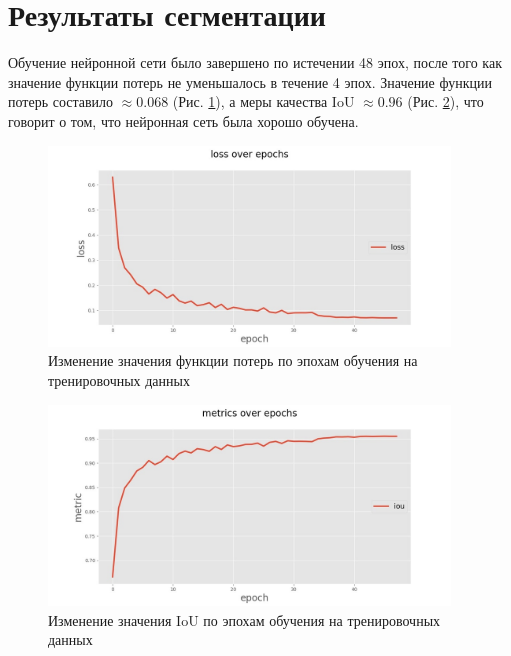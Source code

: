 \section{Результаты сегментации}
Обучение нейронной сети было завершено по истечении 48 эпох, после того как значение функции потерь не уменьшалось в течение 4 эпох. Значение функции потерь составило $\approx 0.068$ (Рис. \ref{fig:train_loss}), а меры качества IoU $\approx 0.96$ (Рис. \ref{fig:train_iou}), что говорит о том, что нейронная сеть была хорошо обучена.
\\
\begin{figure}[H]
    \centering
    \includegraphics[width=0.95\textwidth]{pics/loss.jpg}
    \caption{Изменение значения функции потерь по эпохам обучения на тренировочных данных}
    \label{fig:train_loss}
\end{figure}

\begin{figure}[H]
    \centering
    \includegraphics[width=0.95\textwidth]{pics/metrics.jpg}
    \caption{Изменение значения IoU по эпохам обучения на тренировочных данных}
    \label{fig:train_iou}
\end{figure}

